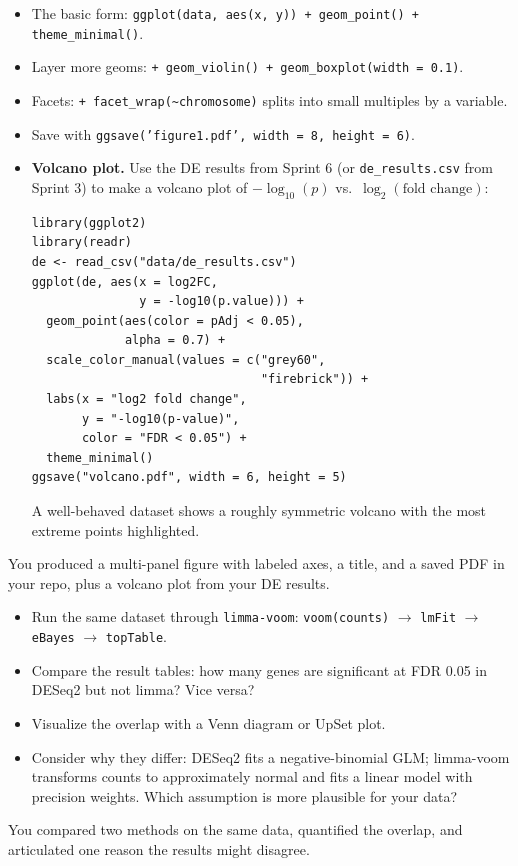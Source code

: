 \begin{itemize}[nosep]
  \item The basic form: \texttt{ggplot(data, aes(x, y)) + geom\_point() + theme\_minimal()}.
  \item Layer more geoms: \texttt{+ geom\_violin() + geom\_boxplot(width = 0.1)}.
  \item Facets: \texttt{+ facet\_wrap(\textasciitilde chromosome)} splits into small multiples by a variable.
  \item Save with \texttt{ggsave('figure1.pdf', width = 8, height = 6)}.
  \item \textbf{Volcano plot.} Use the DE results from Sprint 6 (or \texttt{de\_results.csv} from Sprint 3) to make a volcano plot of $-\log_{10}(p)$ vs.\ $\log_2(\text{fold change})$:
    \begin{lstlisting}
library(ggplot2)
library(readr)
de <- read_csv("data/de_results.csv")
ggplot(de, aes(x = log2FC,
               y = -log10(p.value))) +
  geom_point(aes(color = pAdj < 0.05),
             alpha = 0.7) +
  scale_color_manual(values = c("grey60",
                                "firebrick")) +
  labs(x = "log2 fold change",
       y = "-log10(p-value)",
       color = "FDR < 0.05") +
  theme_minimal()
ggsave("volcano.pdf", width = 6, height = 5)
    \end{lstlisting}
    A well-behaved dataset shows a roughly symmetric volcano with the most extreme points highlighted.
\end{itemize}
\begin{winbox}[Checkpoint]
You produced a multi-panel figure with labeled axes, a title, and a saved PDF in your repo, plus a volcano plot from your DE results.
\end{winbox}

\begin{itemize}[nosep]
  \item Run the same dataset through \texttt{limma-voom}: \texttt{voom(counts)} $\to$ \texttt{lmFit} $\to$ \texttt{eBayes} $\to$ \texttt{topTable}.
  \item Compare the result tables: how many genes are significant at FDR 0.05 in DESeq2 but not limma? Vice versa?
  \item Visualize the overlap with a Venn diagram or UpSet plot.
  \item Consider why they differ: DESeq2 fits a negative-binomial GLM; limma-voom transforms counts to approximately normal and fits a linear model with precision weights. Which assumption is more plausible for your data?
\end{itemize}
\begin{winbox}[Checkpoint]
You compared two methods on the same data, quantified the overlap, and articulated one reason the results might disagree.
\end{winbox}

